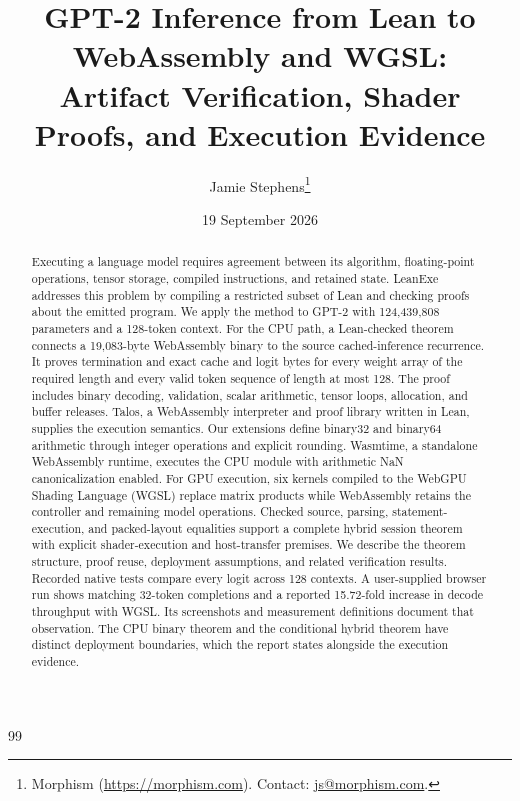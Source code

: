 \documentclass[11pt]{article}
\title{GPT-2 Inference from Lean to WebAssembly and WGSL:\\
Artifact Verification, Shader Proofs, and Execution Evidence}
\author{Jamie Stephens\thanks{Morphism (\url{https://morphism.com}).  Contact: \href{mailto:js@morphism.com}{js@morphism.com}.}}
\date{19 September 2026}
\begin{document}
\maketitle
\begin{abstract}
Executing a language model requires agreement between its algorithm, floating-point operations, tensor storage, compiled instructions, and retained state.  LeanExe addresses this problem by compiling a restricted subset of Lean and checking proofs about the emitted program.  We apply the method to GPT-2 with 124,439,808 parameters and a 128-token context.  For the CPU path, a Lean-checked theorem connects a 19,083-byte WebAssembly binary to the source cached-inference recurrence.  It proves termination and exact cache and logit bytes for every weight array of the required length and every valid token sequence of length at most 128.  The proof includes binary decoding, validation, scalar arithmetic, tensor loops, allocation, and buffer releases.  Talos, a WebAssembly interpreter and proof library written in Lean, supplies the execution semantics.  Our extensions define binary32 and binary64 arithmetic through integer operations and explicit rounding.  Wasmtime, a standalone WebAssembly runtime, executes the CPU module with arithmetic NaN canonicalization enabled.  For GPU execution, six kernels compiled to the WebGPU Shading Language (WGSL) replace matrix products while WebAssembly retains the controller and remaining model operations.  Checked source, parsing, statement-execution, and packed-layout equalities support a complete hybrid session theorem with explicit shader-execution and host-transfer premises.  We describe the theorem structure, proof reuse, deployment assumptions, and related verification results.  Recorded native tests compare every logit across 128 contexts.  A user-supplied browser run shows matching 32-token completions and a reported 15.72-fold increase in decode throughput with WGSL.  Its screenshots and measurement definitions document that observation.  The CPU binary theorem and the conditional hybrid theorem have distinct deployment boundaries, which the report states alongside the execution evidence.
\end{abstract}

\tableofcontents
\clearpage











\appendix

\begin{thebibliography}{99}


\end{thebibliography}
\end{document}
